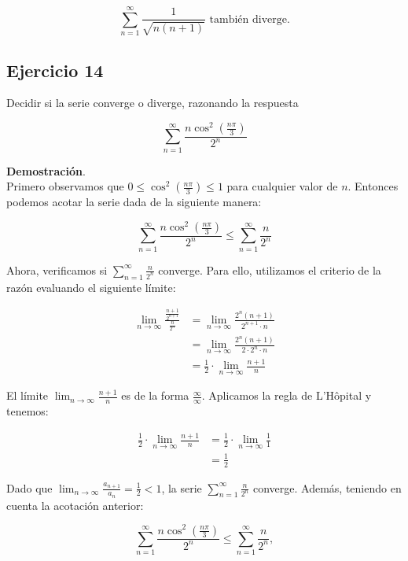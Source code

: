 \documentclass{article}
\begin{document}
    \[
    \sum_{n=1}^{\infty} \frac{1}{\sqrt{n(n+1)}} \text{ también diverge.}
    \]

    \subsection*{Ejercicio 14}

    Decidir si la serie converge o diverge, razonando la respuesta

    $$
    \sum_{n=1}^{\infty} \frac{n \cos ^{2}\left(\frac{n \pi}{3}\right)}{2^{n}}
    $$

    \textbf{Demostración}.\\

    Primero observamos que $0 \leq \cos ^{2}\left(\frac{n \pi}{3}\right) \leq 1$ para cualquier valor de $n$. Entonces podemos acotar la serie dada de la siguiente manera:

    $$
    \sum_{n=1}^{\infty} \frac{n \cos ^{2}\left(\frac{n \pi}{3}\right)}{2^{n}} \leq \sum_{n=1}^{\infty} \frac{n}{2^{n}}
    $$

    Ahora, verificamos si $\sum_{n=1}^{\infty} \frac{n}{2^{n}}$ converge. Para ello, utilizamos el criterio de la razón evaluando el siguiente límite:

    \begin{align*}
    \lim _{n \rightarrow \infty} \frac{\frac{n+1}{2^{n+1}}}{\frac{n}{2^{n}}} &= \lim _{n \rightarrow \infty} \frac{2^{n}(n+1)}{2^{n+1} \cdot n} \\
    &= \lim _{n \rightarrow \infty} \frac{2^{n}(n+1)}{2 \cdot 2^{n} \cdot n} \\
    &= \frac{1}{2} \cdot \lim _{n \rightarrow \infty} \frac{n+1}{n}
    \end{align*}

    El límite $\lim _{n \rightarrow \infty} \frac{n+1}{n}$ es de la forma $\frac{\infty}{\infty}$. Aplicamos la regla de L'Hôpital y tenemos:

    \begin{align*}
    \frac{1}{2} \cdot \lim _{n \rightarrow \infty} \frac{n+1}{n} &= \frac{1}{2} \cdot \lim _{n \rightarrow \infty} \frac{1}{1} \\
    &= \frac{1}{2}
    \end{align*}

    Dado que $\lim _{n \rightarrow \infty} \frac{a_{n+1}}{a_{n}} = \frac{1}{2} < 1$, la serie $\sum_{n=1}^{\infty} \frac{n}{2^{n}}$ converge. Además, teniendo en cuenta la acotación anterior:

    $$
    \sum_{n=1}^{\infty} \frac{n \cos ^{2}\left(\frac{n \pi}{3}\right)}{2^{n}} \leq \sum_{n=1}^{\infty} \frac{n}{2^{n}},
    $$
\end{document}
